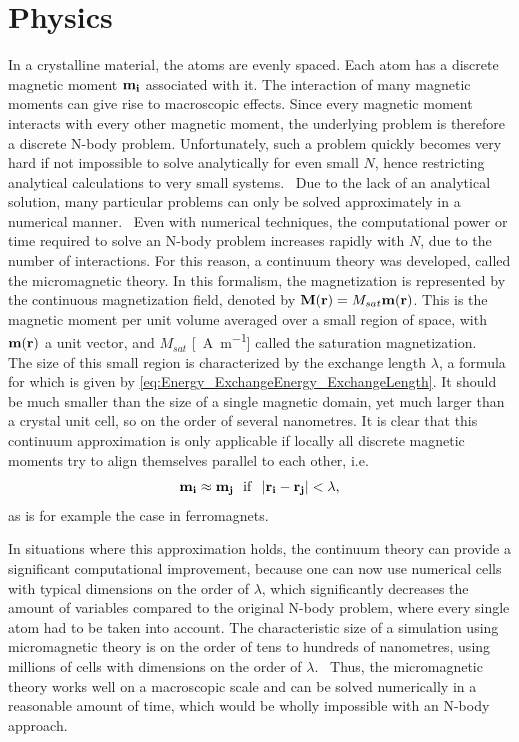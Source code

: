 \documentclass[12pt,a4paper]{article}
\begin{document}
\section{Physics}
In a crystalline material, the atoms are evenly spaced. Each atom has a discrete magnetic moment $\vb{m_i}$ associated with it. The interaction of many magnetic moments can give rise to macroscopic effects. Since every magnetic moment interacts with every other magnetic moment, the underlying problem is therefore a discrete N-body problem. Unfortunately, such a problem quickly becomes very hard if not impossible to solve analytically for even small $N$, hence restricting analytical calculations to very small systems.~\cite{abert2013discrete} Due to the lack of an analytical solution, many particular problems can only be solved approximately in a numerical manner.~\cite{abert2013discrete} Even with numerical techniques, the computational power or time required to solve an N-body problem increases rapidly with $N$, due to the number of interactions. For this reason, a continuum theory was developed, called the micromagnetic theory. In this formalism, the magnetization is represented by the continuous magnetization field, denoted by $\vb{M}(\vb{r}) = M_{sat} \vb{m}(\vb{r})$. This is the magnetic moment per unit volume averaged over a small region of space, with $\vb{m}(\vb{r})$ a unit vector, and $M_{sat}$ [\SI{}{\ampere\per\metre}] called the saturation magnetization.~\cite{Gilbert1956}
The size of this small region is characterized by the exchange length $\lambda$, a formula for which is given by \cref{eq:Energy_ExchangeEnergy_ExchangeLength}. It should be much smaller than the size of a single magnetic domain, yet much larger than a crystal unit cell, so on the order of several nanometres. It is clear that this continuum approximation is only applicable if locally all discrete magnetic moments try to align themselves parallel to each other, i.e.
\begin{equation}
    \vb{m_i} \approx \vb{m_j}~~\mathrm{if}~~\abs{\vb{r_i} - \vb{r_j}} < \lambda \mathrm{,}
\end{equation}
as is for example the case in ferromagnets.~\cite{abert2013discrete} \par
In situations where this approximation holds, the continuum theory can provide a significant computational improvement, because one can now use numerical cells with typical dimensions on the order of $\lambda$, which significantly decreases the amount of variables compared to the original N-body problem, where every single atom had to be taken into account. The characteristic size of a simulation using micromagnetic theory is on the order of tens to hundreds of nanometres, using millions of cells with dimensions on the order of $\lambda$.~\cite{abert2013discrete} Thus, the micromagnetic theory works well on a macroscopic scale and can be solved numerically in a reasonable amount of time, which would be wholly impossible with an N-body approach.
\end{document}
